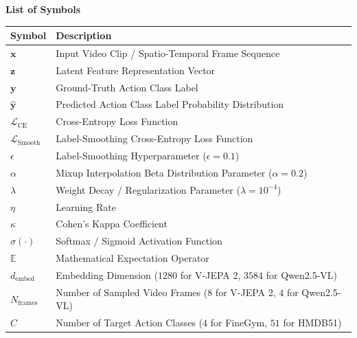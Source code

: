 
\newpage
{}
{}

\begin{center}
{\fontsize{16}{20}\selectfont \textbf{List of Symbols}}
\end{center}

\vspace{0.5cm}

\begin{longtable}{@{}p{3.5cm}p{10.5cm}@{}}
\toprule
\textbf{Symbol} & \textbf{Description} \\
\midrule
\endhead
$\mathbf{x}$ & Input Video Clip / Spatio-Temporal Frame Sequence \\
$\mathbf{z}$ & Latent Feature Representation Vector \\
$\mathbf{y}$ & Ground-Truth Action Class Label \\
$\hat{\mathbf{y}}$ & Predicted Action Class Label Probability Distribution \\
$\mathcal{L}_{\text{CE}}$ & Cross-Entropy Loss Function \\
$\mathcal{L}_{\text{Smooth}}$ & Label-Smoothing Cross-Entropy Loss Function \\
$\epsilon$ & Label-Smoothing Hyperparameter ($\epsilon = 0.1$) \\
$\alpha$ & Mixup Interpolation Beta Distribution Parameter ($\alpha = 0.2$) \\
$\lambda$ & Weight Decay / Regularization Parameter ($\lambda = 10^{-4}$) \\
$\eta$ & Learning Rate \\
$\kappa$ & Cohen's Kappa Coefficient \\
$\sigma(\cdot)$ & Softmax / Sigmoid Activation Function \\
$\mathbb{E}$ & Mathematical Expectation Operator \\
$d_{\text{embed}}$ & Embedding Dimension ($1280$ for V-JEPA 2, $3584$ for Qwen2.5-VL) \\
$N_{\text{frames}}$ & Number of Sampled Video Frames ($8$ for V-JEPA 2, $4$ for Qwen2.5-VL) \\
$C$ & Number of Target Action Classes ($4$ for FineGym, $51$ for HMDB51) \\
\bottomrule
\end{longtable}
